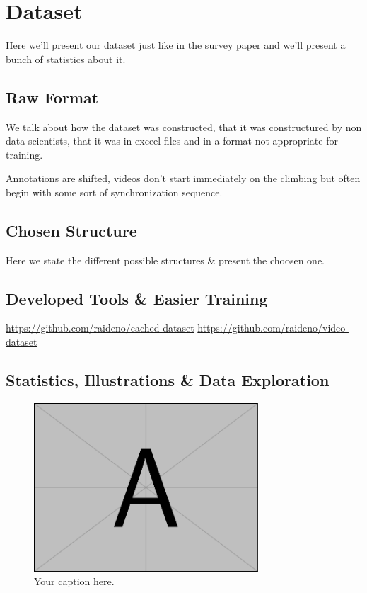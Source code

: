 \section{Dataset}

Here we'll present our dataset just like in the survey paper and we'll present a bunch of statistics about it.

\subsection{Raw Format}
We talk about how the dataset was constructed, that it was constructured by non data scientists, that it was in exceel files and in a format not appropriate for training.

Annotations are shifted, videos don't start immediately on the climbing but often begin with some sort of synchronization sequence.

\subsection{Chosen Structure}
Here we state the different possible structures \& present the choosen one.

\subsection{Developed Tools \& Easier Training}

\href{https://github.com/raideno/cached-dataset}{https://github.com/raideno/cached-dataset}
\href{https://github.com/raideno/video-dataset}{https://github.com/raideno/video-dataset}

\subsection{Statistics, Illustrations \& Data Exploration}

\begin{figure}[ht]
    \centering
    \includegraphics[width=8.4cm]{assets/mwe/example-image-a}
    \caption{Your caption here.}
    \label{fig:example}
\end{figure}

